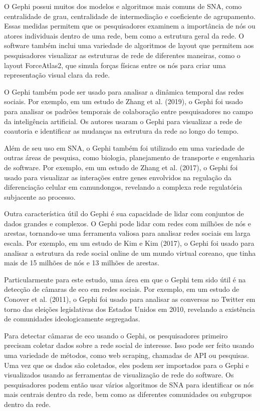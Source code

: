 O Gephi possui muitos dos modelos e algoritmos mais comuns de SNA, como centralidade de grau, centralidade de intermediação e coeficiente de agrupamento. Essas medidas permitem que os pesquisadores examinem a importância de nós ou atores individuais dentro de uma rede, bem como a estrutura geral da rede. O software também inclui uma variedade de algoritmos de layout que permitem aos pesquisadores visualizar as estruturas de rede de diferentes maneiras, como o layout ForceAtlas2, que simula forças físicas entre os nós para criar uma representação visual clara da rede.

O Gephi também pode ser usado para analisar a dinâmica temporal das redes sociais. Por exemplo, em um estudo de Zhang et al. (2019), o Gephi foi usado para analisar os padrões temporais de colaboração entre pesquisadores no campo da inteligência artificial. Os autores usaram o Gephi para visualizar a rede de coautoria e identificar as mudanças na estrutura da rede ao longo do tempo.

Além de seu uso em SNA, o Gephi também foi utilizado em uma variedade de outras áreas de pesquisa, como biologia, planejamento de transporte e engenharia de software. Por exemplo, em um estudo de Zhang et al. (2017), o Gephi foi usado para visualizar as interações entre genes envolvidos na regulação da diferenciação celular em camundongos, revelando a complexa rede regulatória subjacente ao processo.

Outra característica útil do Gephi é sua capacidade de lidar com conjuntos de dados grandes e complexos. O Gephi pode lidar com redes com milhões de nós e arestas, tornando-se uma ferramenta valiosa para analisar redes sociais em larga escala. Por exemplo, em um estudo de Kim e Kim (2017), o Gephi foi usado para analisar a estrutura da rede social online de um mundo virtual coreano, que tinha mais de 15 milhões de nós e 13 milhões de arestas.

Particularmente para este estudo, uma área em que o Gephi tem sido útil é na detecção de câmaras de eco em redes sociais. Por exemplo, em um estudo de Conover et al. (2011), o Gephi foi usado para analisar as conversas no Twitter em torno das eleições legislativas dos Estados Unidos em 2010, revelando a existência de comunidades ideologicamente segregadas.

Para detectar câmaras de eco usando o Gephi, os pesquisadores primeiro precisam coletar dados sobre a rede social de interesse. Isso pode ser feito usando uma variedade de métodos, como web scraping, chamadas de API ou pesquisas. Uma vez que os dados são coletados, eles podem ser importados para o Gephi e visualizados usando as ferramentas de visualização de rede do software. Os pesquisadores podem então usar vários algoritmos de SNA para identificar os nós mais centrais dentro da rede, bem como as diferentes comunidades ou subgrupos dentro da rede.

